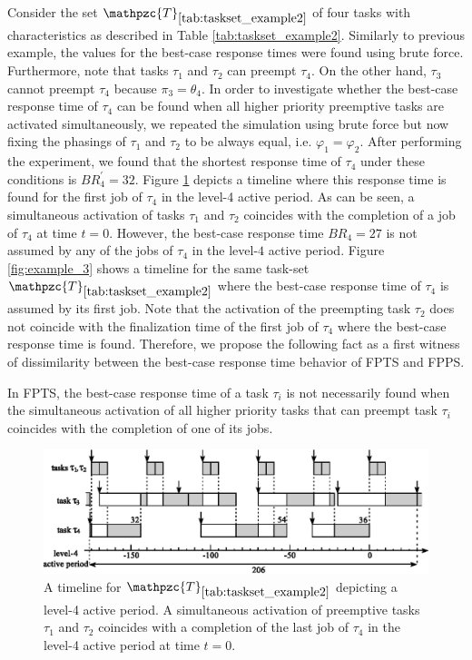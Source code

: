 Consider the set $\mathpzc{T}_{\ref{tab:taskset_example2}}$ of four tasks with characteristics as described in Table \ref{tab:taskset_example2}. Similarly to previous example, the values for the best-case response times were found using brute force. Furthermore, note that tasks $\tau_1$ and $\tau_2$ can preempt $\tau_4$. On the other hand, $\tau_3$ cannot preempt $\tau_4$ because $\pi_3 = \theta_4$. In order to investigate whether the best-case response time of $\tau_4$ can be found when all higher priority preemptive tasks are activated simultaneously, we repeated the simulation using brute force but now fixing the phasings of $\tau_1$ and $\tau_2$ to be always equal, i.e. $\varphi_1 = \varphi_2$. After performing the experiment, we found that the shortest response time of $\tau_4$ under these conditions is $BR^{\prime}_4 = 32$. Figure \ref{fig:example_2} depicts a timeline where this response time is found for the first job of $\tau_4$ in the level-4 active period. As can be seen, a simultaneous activation of tasks $\tau_1$ and $\tau_2$ coincides with the completion of a job of $\tau_4$ at time $t=0$. However, the best-case response time $BR_4=27$ is not assumed by any of the jobs of $\tau_4$ in the level-$4$ active period. Figure \ref{fig:example_3} shows a timeline for the same task-set $\mathpzc{T}_{\ref{tab:taskset_example2}}$ where the best-case response time of $\tau_4$ is assumed by its first job. Note that the activation of the preempting task $\tau_2$ does not coincide with the finalization time of the first job of $\tau_4$ where the best-case response time is found. Therefore, we propose the following fact as a first witness of dissimilarity between the best-case response time behavior of FPTS and FPPS.

\begin{fact}\label{fct:realese_preempt_tasks}
	In FPTS, the best-case response time of a task $\tau_i$ is not necessarily found when the simultaneous activation of all higher priority tasks that can preempt task $\tau_i$ coincides with the completion of one of its jobs.
\end{fact}

\begin{figure}[h]
	\centering
	\includegraphics[width=.84\linewidth]{figures/example_2}
	\caption{A timeline for $\mathpzc{T}_{\ref{tab:taskset_example2}}$ depicting a level-4 active period. A simultaneous activation of preemptive tasks $\tau_1$ and $\tau_2$ coincides with a completion of the last job of $\tau_4$ in the level-4 active period at time $t=0$.}
	\label{fig:example_2}
\end{figure}


